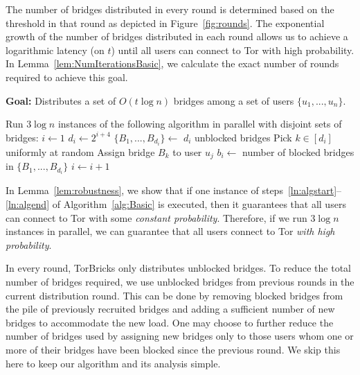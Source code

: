 \documentclass[letterpaper,twocolumn,10pt]{article}
\newcommand{\algFont}{\fontsize{10}{13}\selectfont}
\newcommand{\bricks}{}
\def\bricks/{\mbox{TorBricks}}
\begin{document}
The number of bridges distributed in every round is determined based on the threshold in that round as depicted in Figure~\ref{fig:rounds}. The exponential growth of the number of bridges distributed in each round allows us to achieve a logarithmic latency (on $t$) until all users can connect to Tor with high probability. In Lemma~\ref{lem:NumIterationsBasic}, we calculate the exact number of rounds required to achieve this goal.
\begin{algorithm}[t]
	\caption{\bricks/ -- Basic Algorithm}
	\label{alg:Basic}
	\vspace{0.4em}
	\textbf{Goal:} Distributes a set of $O(t\log{n})$ bridges among a set of users $\{u_1,...,u_n\}$.
	
	\algFont \vspace{2pt}
	\begin{algorithmic}[1]
		\Statex \hspace{-\algorithmicindent} Run $3\log{n}$ instances of the following algorithm in parallel with disjoint sets of bridges:
		\State ${i \gets 1}$  \label{ln:algstart}
		\While{\True}
			\State $d_i \gets 2^{i+4}$	\label{ln:forparallel} \label{ln:ifreasonable}
				\State $\{B_1,...,B_{d_i}\} \gets$ $d_i$ unblocked bridges \label{ln:RecruitBridges}						
					
					\State Pick $k \in [d_i]$ uniformly at random 
					\State Assign bridge $B_{k}$ to user $u_j$				
				\EndFor			\label{ln:IterationEnd}
			 \label{ln:ConditionSimple} 
				\State $b_i \gets$ number of blocked bridges in $\{B_1, ..., B_{d_i}\}$
			\EndWhile
			\State $i \gets i+1$ \label{ln:IncrementSimple}
		\EndWhile	\label{ln:algend}
	\end{algorithmic}	
\end{algorithm}
In Lemma~\ref{lem:robustness}, we show that if one instance of steps~\ref{ln:algstart}--\ref{ln:algend} of Algorithm~\ref{alg:Basic} is executed, then it guarantees that all users can connect to Tor with some \emph{constant probability}. Therefore, if we run $3\log{n}$ instances in parallel, we can guarantee that all users connect to Tor \emph{with high probability}.

In every round, \bricks/ only distributes unblocked bridges. To reduce the total number of bridges required, we use unblocked bridges from previous rounds in the current distribution round. This can be done by removing blocked bridges from the pile of previously recruited bridges and adding a sufficient number of new bridges to accommodate the new load. One may choose to further reduce the number of bridges used by assigning new bridges only to those users whom one or more of their bridges have been blocked since the previous round. We skip this here to keep our algorithm and its analysis simple.
\end{document}
